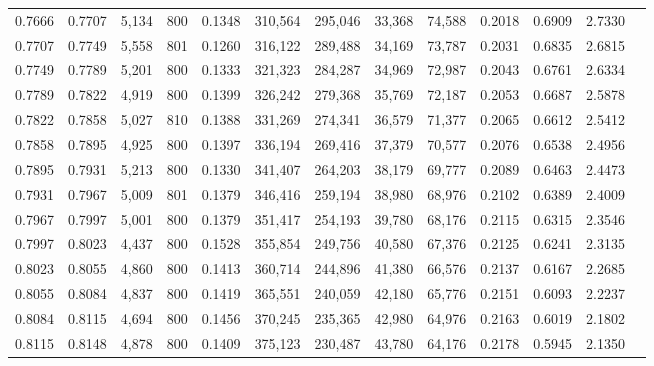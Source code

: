 \begin{tabular}{rrrrrrrrrrrrr}
0.7666 & 0.7707 &  5,134 & 800 &                                     0.1348 & 310,564 & 295,046 &  33,368 &  74,588 & 0.2018 & 0.6909 & 2.7330 \\
0.7707 & 0.7749 &  5,558 & 801 &                                     0.1260 & 316,122 & 289,488 &  34,169 &  73,787 & 0.2031 & 0.6835 & 2.6815 \\
0.7749 & 0.7789 &  5,201 & 800 &                                     0.1333 & 321,323 & 284,287 &  34,969 &  72,987 & 0.2043 & 0.6761 & 2.6334 \\
0.7789 & 0.7822 &  4,919 & 800 &                                     0.1399 & 326,242 & 279,368 &  35,769 &  72,187 & 0.2053 & 0.6687 & 2.5878 \\
0.7822 & 0.7858 &  5,027 & 810 &                                     0.1388 & 331,269 & 274,341 &  36,579 &  71,377 & 0.2065 & 0.6612 & 2.5412 \\
0.7858 & 0.7895 &  4,925 & 800 &                                     0.1397 & 336,194 & 269,416 &  37,379 &  70,577 & 0.2076 & 0.6538 & 2.4956 \\
0.7895 & 0.7931 &  5,213 & 800 &                                     0.1330 & 341,407 & 264,203 &  38,179 &  69,777 & 0.2089 & 0.6463 & 2.4473 \\
0.7931 & 0.7967 &  5,009 & 801 &                                     0.1379 & 346,416 & 259,194 &  38,980 &  68,976 & 0.2102 & 0.6389 & 2.4009 \\
0.7967 & 0.7997 &  5,001 & 800 &                                     0.1379 & 351,417 & 254,193 &  39,780 &  68,176 & 0.2115 & 0.6315 & 2.3546 \\
0.7997 & 0.8023 &  4,437 & 800 &                                     0.1528 & 355,854 & 249,756 &  40,580 &  67,376 & 0.2125 & 0.6241 & 2.3135 \\
0.8023 & 0.8055 &  4,860 & 800 &                                     0.1413 & 360,714 & 244,896 &  41,380 &  66,576 & 0.2137 & 0.6167 & 2.2685 \\
0.8055 & 0.8084 &  4,837 & 800 &                                     0.1419 & 365,551 & 240,059 &  42,180 &  65,776 & 0.2151 & 0.6093 & 2.2237 \\
0.8084 & 0.8115 &  4,694 & 800 &                                     0.1456 & 370,245 & 235,365 &  42,980 &  64,976 & 0.2163 & 0.6019 & 2.1802 \\
0.8115 & 0.8148 &  4,878 & 800 &                                     0.1409 & 375,123 & 230,487 &  43,780 &  64,176 & 0.2178 & 0.5945 & 2.1350 \\

\end{tabular}
